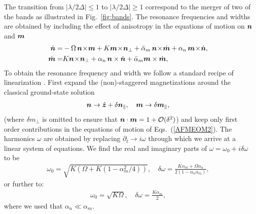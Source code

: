 The transition from $|\lambda/2\Delta|\le1$ to $|\lambda/2\Delta|\ge1$ correspond to the merger of two of the bands as illustrated in Fig.~\ref{fig:bands}. The resonance frequencies and widths are obtained by including the effect of anisotropy in the equations of motion on $\boldsymbol{n}$ and $\boldsymbol{m}$
\beml
\label{AFMEOM2}
\begin{align}
\label{ndot2}
\dot{\bb{n}} = &  -\Omega\, \bb{n}\!\times\!\bb{m} +K \bb{m}\!\times\!\bb{n}_\perp+\bar{\alpha}_m\,\bb{n}\!\times\!\dot{\bb{m}}+\alpha_n\,\bb{m}\!\times\! \dot{\bb{n}},\\
\label{mdot2}
\dot{\bb{m}} = & K  \bb{n}\!\times\!\bb{n}_\perp+\alpha_n\,\bb{n} \times \dot{\bb{n}}+\bar{\alpha}_m \bb{m} \times \dot{\bb{m}} ,
\end{align}
\eml
To obtain the resonance frequency and width we follow a standard recipe of linearization \cite{kittel}. First expand the (non)-staggered magnetizations around the classical ground-state solution
\begin{align}
    \boldsymbol{n}\rightarrow\hat{\boldsymbol{z}} + \delta\boldsymbol{n}_\parallel,\quad \boldsymbol{m}\rightarrow \delta\boldsymbol{m}_\parallel,
\end{align} 
(where $\delta m_\perp$ is omitted to ensure that $\boldsymbol{n}\cdot\boldsymbol{m}=1+\mathcal{O}(\delta^2)$) and keep only first order contributions in the equations of motion of Eqs.~(\ref{AFMEOM2}). The harmonics $\omega$ are obtained by replacing $\partial_t \rightarrow i\omega$ through which we arrive at a linear system of equations. We find the real and imaginary parts of $\omega = \omega_0 + i \delta\omega$ to be
\begin{align}
    \omega_0 = \sqrt{K(\Omega + K(1- \alpha_m^2 / 4))},\quad \delta\omega =  \frac{K \alpha_m + \Omega \alpha_n }{2(1- \alpha_n \alpha_m)},
\end{align}
{\color{blue} or further to:
\begin{align}
    \omega_0 = \sqrt{K\Omega},\quad \delta\omega =  \frac{K \alpha_m}{2},
\end{align}
}
where we used that $\alpha_n\ll\alpha_m$.
